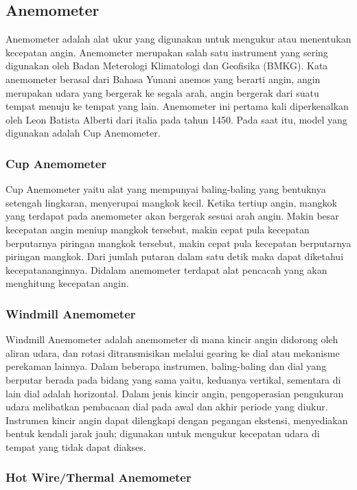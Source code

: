 \subsection{Anemometer}

Anemometer adalah alat ukur yang digunakan untuk mengukur atau menentukan kecepatan angin. Anemometer merupakan salah satu instrument yang sering digunakan oleh Badan Meterologi Klimatologi dan Geofisika (BMKG). Kata anemometer berasal dari Bahasa Yunani anemos yang berarti angin, angin merupakan udara yang bergerak ke segala arah, angin bergerak dari suatu tempat menuju ke tempat yang lain. Anemometer ini pertama kali diperkenalkan oleh Leon Batista Alberti dari italia pada tahun 1450. Pada saat itu, model yang digunakan adalah Cup Anemometer.

\subsubsection{Cup Anemometer}
	Cup Anemometer yaitu alat yang mempunyai baling-baling yang bentuknya setengah lingkaran, menyerupai mangkok kecil. Ketika tertiup angin, mangkok yang terdapat pada anemometer akan bergerak sesuai arah angin. Makin besar kecepatan angin meniup mangkok tersebut, makin cepat pula kecepatan berputarnya piringan mangkok tersebut, makin cepat pula kecepatan berputarnya piringan mangkok. Dari jumlah putaran dalam satu detik maka dapat diketahui kecepatananginnya. Didalam anemometer terdapat alat pencacah yang akan menghitung kecepatan angin.
	
	\subsubsection{Windmill Anemometer}
	
	Windmill Anemometer adalah anemometer di mana kincir angin didorong oleh aliran udara, dan rotasi ditransmisikan melalui gearing ke dial atau mekanisme perekaman lainnya. Dalam beberapa instrumen, baling-baling dan dial yang berputar berada pada bidang yang sama yaitu, keduanya vertikal, sementara di lain dial adalah horizontal. Dalam jenis kincir angin, pengoperasian pengukuran udara melibatkan pembacaan dial pada awal dan akhir periode yang diukur. Instrumen kincir angin dapat dilengkapi dengan pegangan ekstensi, menyediakan bentuk kendali jarak jauh; digunakan untuk mengukur kecepatan udara di tempat yang tidak dapat diakses.
	
	\subsubsection{Hot Wire/Thermal Anemometer}
	
